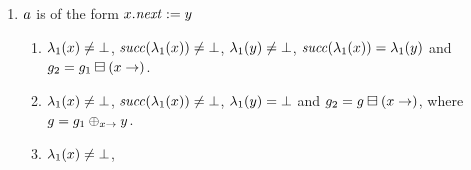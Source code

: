 {\begin{enumerate}
\begin{enumerate}
\begin{itemize}
\begin{enumerate}
      Observe 
      $\graph_1=(\graph_1\delEdge{\yvar})\addEdgeBetween{\yvar}{\xvar}$
      and $(\graph_1\delEdge{\yvar})\in(\graph_1\delVar{\yvar})
      \addVarAsPredOf{\yvar}{\xvar}$.
      Together with $\graph_4=\graph_2$ and $\graph_3=\graph_1\delVar{\yvar}$,
      we get $\graph_4=\graph_1\delVar{\xvar}$
     \item Suppose $\labeling_1(\xvar)\neq\undef$, %
      $\labeling_1(\yvar)\neq\undef$, %
      $\labeling_1(\yvar)\neq\labeling_1(\nil)$, %
      $\suc(\labeling_1(\yvar))=\undef$ and
      $\graph_2=\graph\delVar{\xvar}$, where
      $\graph=\graph_1\addEdgeBetween{\yvar}{\xvar}$.
      We have  $\labeling_3(\xvar)\neq\undef$, %
      $\labeling_3(\yvar)=\undef$.
    \item Suppose $\labeling_1(\xvar)=\undef$, %
      $\labeling_1(\yvar)\neq\undef$, %
      $\suc(\labeling_1(\yvar))\neq\undef$ and %
      $\graph_2=\graph_1$.
      We have  $\labeling_3(\xvar)=\undef$, %
      $\labeling_3(\yvar)=\undef$.
    \item Suppose $\labeling_1(\xvar)=\undef$, %
      $\labeling_1(\yvar)\neq\undef$, %
      $\labeling_1(\yvar)\neq\labeling_1(\nil)$, %
      $\suc(\labeling_1(\yvar))=\undef$ and %
      $\graph_2=\graph_1\addEdge{\yvar}$.
      We have $\labeling_3(\xvar)=\undef$, %
      $\labeling_3(\yvar)=\undef$.
    \item Suppose $\labeling(\yvar)=\undef$.   
      $\graph_3=(\graph_1\delVar{\yvar})=\graph_1$ and 
      $\graph_3\pmovesto{\action}\graph_4$
      follows from $\graph_1\pmovesto{\action}\graph_2$.
    \end{enumerate}
  \end{itemize}
%
\item $a$ is of the form $x.{\it next}:=y$
  \begin{enumerate}
  \item \label{pre:case:dotNextAssignedA}%
    $\labeling_1(\xvar)\neq\undef$, %
    ${\it succ}(\lambda_1(x))\neq\bot$, %
    $\labeling_1(\yvar)\neq\undef$, %
    ${\it succ}(\lambda_1(x))=\lambda_1(y)$ and
    $g_2=g_1\boxminus({x}\rightarrow)$.
  \item \label{pre:case:dotNextAssignedB}%
    $\labeling_1(\xvar)\neq\undef$, %
    ${\it succ}(\lambda_1(x))\neq\bot$, %
    $\lambda_1(y)=\bot$ and %
    $g_2=g\boxminus({x}\rightarrow)$, %
    where $g=g_1\oplus_{{x}\rightarrow}{y}$.
  \item \label{pre:case:dotNextAssignedC}%
    $\labeling_1(\xvar)\neq\undef$, %

\end{enumerate}
\end{enumerate}
\end{enumerate}}
